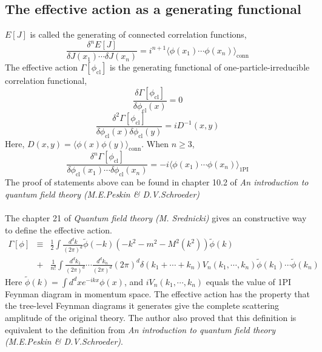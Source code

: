 \documentclass[cyan]{elegantnote}
\begin{document}
\subsection{The effective action as a generating functional}
$E[J]$ is called the generating of connected correlation functions,
\[\frac{\delta^n E[J]}{\delta J(x_1) \cdots \delta J(x_n)} = i^{n+1} \langle \phi(x_1) \cdots \phi(x_n) \rangle_{\mbox{conn}}\]
The effective action $\Gamma[\phi_{\mathrm{cl}}]$ is the generating functional of one-particle-irreducible correlation functional,
\[\frac{\delta \Gamma[\phi_{\mathrm{cl}}]}{\delta \phi_{\mathrm{cl}}(x)}  = 0\]
\[\frac{\delta^2 \Gamma[\phi_{\mathrm{cl}}]}{\delta \phi_{\mathrm{cl}}(x) \delta \phi_{\mathrm{cl}}(y)}  = iD^{-1}(x,y)\]
Here, $D(x,y) = \langle \phi(x) \phi(y) \rangle_{\mbox{conn}}$. When $n \geq 3$,
\[\frac{\delta^n \Gamma[\phi_{\mathrm{cl}}]}{\delta \phi_{\mathrm{cl}}(x_1) \cdots \delta \phi_{\mathrm{cl}}(x_n)} = -i \langle \phi(x_1) \cdots \phi(x_n) \rangle_{\mbox{1PI}}\]
The proof of statements above can be found in chapter 10.2 of \emph{An introduction to quantum field theory (M.E.Peskin \& D.V.Schroeder)}\\ \\
The chapter 21 of \emph{Quantum field theory (M. Srednicki)} gives an constructive way to define the effective action.
\begin{eqnarray}
\Gamma[\phi] & \equiv & \frac{1}{2} \int \frac{d^d k}{(2\pi)^d} \tilde{\phi}(-k)(-k^2 - m^2 - M^2(k^2))\tilde{\phi}(k) \nonumber \\
& + & \frac{1}{n!} \int \frac{d^d k_1}{(2\pi)^d} \cdots \frac{d^d k_n}{(2\pi)^d} (2\pi)^d \delta(k_1+\cdots+k_n) V_n(k_1,\cdots,k_n) \tilde{\phi}(k_1) \cdots \tilde{\phi}(k_n) \nonumber
\end{eqnarray}
Here $\tilde{\phi}(k) = \int d^dx e^{-ikx} \phi(x)$, and $iV_n(k_1,\cdots,k_n)$ equals the value of 1PI Feynman diagram in momentum space. The effective action has the property that the tree-level Feynman diagrams it generates give the complete scattering amplitude of the original theory. The author also proved that this definition is equivalent to the definition from \emph{An introduction to quantum field theory (M.E.Peskin \& D.V.Schroeder)}.
  
\end{document}
